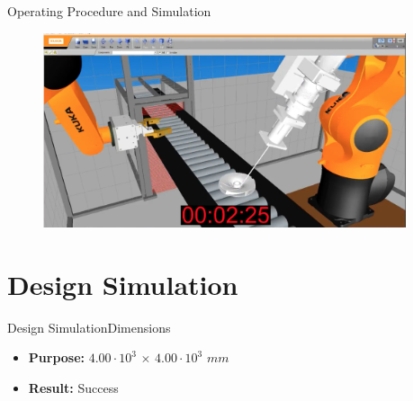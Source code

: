 \begin{frame}{Operating Procedure and Simulation}
\begin{figure}
\centering
\includegraphics[width=0.95\textwidth]{graphics/hugo/sim}
\end{figure}
\end{frame}

\section{Design Simulation}
\begin{frame}{Design Simulation}{Dimensions}
\begin{itemize}
        \item \textbf{Purpose:} $4.00\cdot10^{3}$ $\times$ $4.00\cdot10^{3}$ $mm$ 
        \item \textbf{Result:} Success
\end{itemize}

\end{frame}

